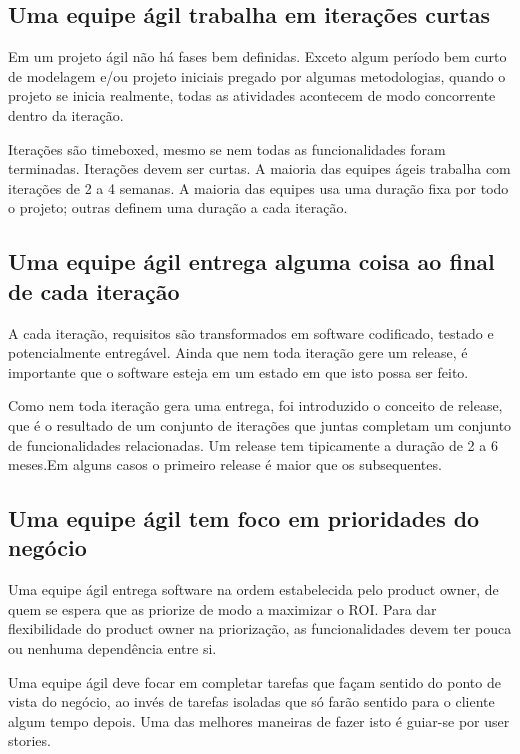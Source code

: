 \documentclass[a4paper,abntfigtabnum,noindentfirst]{abnt}
\begin{document}
\subsection{Uma equipe ágil trabalha em iterações curtas}

Em um projeto ágil não há fases bem definidas. Exceto algum período bem curto de modelagem e/ou projeto iniciais pregado por algumas metodologias, quando o projeto se inicia realmente, todas as atividades acontecem de modo concorrente dentro da iteração.

Iterações são timeboxed, mesmo se nem todas as funcionalidades foram terminadas. Iterações devem ser curtas. A maioria das equipes ágeis trabalha com iterações de 2 a 4 semanas. A maioria das equipes usa uma duração fixa por todo o projeto; outras definem uma duração a cada iteração.


\subsection{Uma equipe ágil entrega alguma coisa ao final de cada iteração}

A cada iteração, requisitos são transformados em software codificado, testado e potencialmente entregável. Ainda que nem toda iteração gere um release, é importante que o software esteja em um estado em que isto possa ser feito.

Como nem toda iteração gera uma entrega, foi introduzido o conceito de release, que é o resultado de um conjunto de iterações que juntas completam um conjunto de funcionalidades relacionadas. Um release tem tipicamente a duração de 2 a 6 meses.Em alguns casos o primeiro release é maior que os subsequentes.


\subsection{Uma equipe ágil tem foco em prioridades do negócio}

Uma equipe ágil entrega software na ordem estabelecida pelo product owner, de quem se espera que as priorize de modo a maximizar o ROI. Para dar flexibilidade do product owner na priorização, as funcionalidades devem ter pouca ou nenhuma dependência entre si.

Uma equipe ágil deve focar em completar tarefas que façam sentido do ponto de vista do negócio, ao invés de tarefas isoladas que só farão sentido para o cliente algum tempo depois. Uma das melhores maneiras de fazer isto é guiar-se por user stories.
\end{document}
